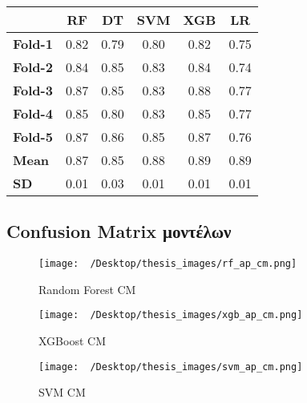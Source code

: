 \documentclass[diploma]{softlab-thesis}
\begin{document}
\begin{enumerate}
\begin{enumerate}
\begin{table}[H]
\centering
\begin{tabular}{|l|c|c|c|c|c|}\hline
                & \textbf{RF} & \textbf{DT} & \textbf{SVM} & \textbf{XGB} & \textbf{LR} \\ \hline
\textbf{Fold-1} &    0.82         &     0.79        &    0.80          &    0.82          &     0.75        \\ \hline
\textbf{Fold-2} &     0.84        &       0.85      &     0.83         &       0.84       &     0.74        \\ \hline
\textbf{Fold-3} &     0.87        &      0.85       &        0.83     &    0.88         &     0.77        \\ \hline
\textbf{Fold-4} &     0.85        &     0.80        &      0.83        &     0.85         &    0.77         \\ \hline
\textbf{Fold-5} &     0.87        &         0.86    &      0.85       &        0.87     &       0.76      \\ \hline
\textbf{Mean}   &      0.87      &      0.85      &      0.88        &       0.89       &     0.89        \\ \hline
\textbf{SD}     &     0.01        &     0.03        &     0.01         &        0.01      &    0.01         \\ \hline
\end{tabular}
\end{table}

\subsection{Confusion Matrix μοντέλων}

\begin{figure}[H]
    \centering
    \texttt{[image: ~/Desktop/thesis\_images/rf\_ap\_cm.png]} %
    \caption{Random Forest CM}
    \label{fig:your_image_label}
\end{figure}

\begin{figure}[H]
    \centering
    \texttt{[image: ~/Desktop/thesis\_images/xgb\_ap\_cm.png]} %
    \caption{XGBoost CM}
    \label{fig:your_image_label}
\end{figure}

\begin{figure}[H]
    \centering
    \texttt{[image: ~/Desktop/thesis\_images/svm\_ap\_cm.png]} %
    \caption{SVM CM}
    \label{fig:your_image_label}
\end{figure}


\end{enumerate}
\end{enumerate}
\end{document}
